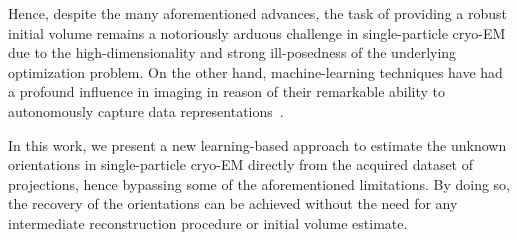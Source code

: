 Hence, despite the many aforementioned advances, the task of providing a robust initial volume remains a notoriously arduous challenge in single-particle cryo-EM due to the high-dimensionality and strong ill-posedness of the underlying optimization problem.
On the other hand, machine-learning techniques have had a profound influence in imaging in reason of their remarkable ability to autonomously capture data representations~\cite{lecun2015deep}.

In this work, we present a new learning-based approach to estimate the unknown orientations in single-particle cryo-EM directly from the acquired dataset of projections, hence bypassing some of the aforementioned limitations.
By doing so, the recovery of the orientations can be achieved without the need for any intermediate reconstruction procedure or initial volume estimate. %

